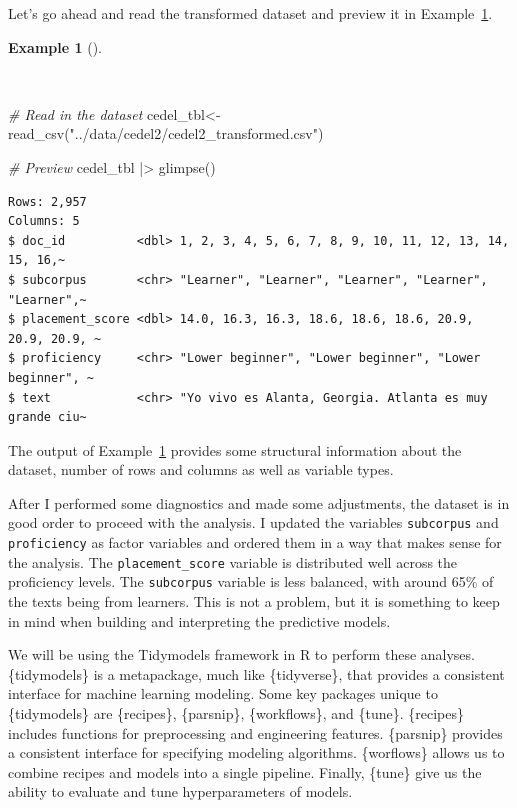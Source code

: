 \documentclass[
  letterpaper,
]{book}
\newenvironment{Shaded}{\begin{snugshade}}{\end{snugshade}}
\newcommand{\CommentTok}[1]{\textcolor[rgb]{0.00,0.00,0.00}{\textit{#1}}}
\newcommand{\FunctionTok}[1]{\textcolor[rgb]{0.00,0.00,0.00}{#1}}
\newcommand{\NormalTok}[1]{\textcolor[rgb]{0.00,0.00,0.00}{#1}}
\newcommand{\OtherTok}[1]{\textcolor[rgb]{0.00,0.00,0.00}{#1}}
\newcommand{\SpecialCharTok}[1]{\textcolor[rgb]{0.00,0.00,0.00}{#1}}
\newcommand{\StringTok}[1]{\textcolor[rgb]{0.00,0.00,0.00}{#1}}
\theoremstyle{definition}
\newtheorem{example}{Example}[chapter]
\theoremstyle{remark}
\begin{document}
Let's go ahead and read the transformed dataset and preview it in
Example~\ref{exm-predict-cedel-read}.

\begin{example}[]\protect\hypertarget{exm-predict-cedel-read}{}\label{exm-predict-cedel-read}

~

\begin{Shaded}
\begin{Highlighting}[]
\CommentTok{\# Read in the dataset}
\NormalTok{cedel\_tbl}\OtherTok{\textless{}{-}}
  \FunctionTok{read\_csv}\NormalTok{(}\StringTok{"../data/cedel2/cedel2\_transformed.csv"}\NormalTok{)}

\CommentTok{\# Preview}
\NormalTok{cedel\_tbl }\SpecialCharTok{|\textgreater{}} \FunctionTok{glimpse}\NormalTok{()}
\end{Highlighting}
\end{Shaded}

\begin{verbatim}
Rows: 2,957
Columns: 5
$ doc_id          <dbl> 1, 2, 3, 4, 5, 6, 7, 8, 9, 10, 11, 12, 13, 14, 15, 16,~
$ subcorpus       <chr> "Learner", "Learner", "Learner", "Learner", "Learner",~
$ placement_score <dbl> 14.0, 16.3, 16.3, 18.6, 18.6, 18.6, 20.9, 20.9, 20.9, ~
$ proficiency     <chr> "Lower beginner", "Lower beginner", "Lower beginner", ~
$ text            <chr> "Yo vivo es Alanta, Georgia. Atlanta es muy grande ciu~
\end{verbatim}

\end{example}

The output of Example~\ref{exm-predict-cedel-read} provides some
structural information about the dataset, number of rows and columns as
well as variable types.

After I performed some diagnostics and made some adjustments, the
dataset is in good order to proceed with the analysis. I updated the
variables \texttt{subcorpus} and \texttt{proficiency} as factor
variables and ordered them in a way that makes sense for the analysis.
The \texttt{placement\_score} variable is distributed well across the
proficiency levels. The \texttt{subcorpus} variable is less balanced,
with around 65\% of the texts being from learners. This is not a
problem, but it is something to keep in mind when building and
interpreting the predictive models.

We will be using the Tidymodels framework in R to perform these
analyses. \{tidymodels\} is a metapackage, much like \{tidyverse\}, that
provides a consistent interface for machine learning modeling. Some key
packages unique to \{tidymodels\} are \{recipes\}, \{parsnip\},
\{workflows\}, and \{tune\}. \{recipes\} includes functions for
preprocessing and engineering features. \{parsnip\} provides a
consistent interface for specifying modeling algorithms. \{worflows\}
allows us to combine recipes and models into a single pipeline. Finally,
\{tune\} give us the ability to evaluate and tune hyperparameters of
models.
\end{document}
